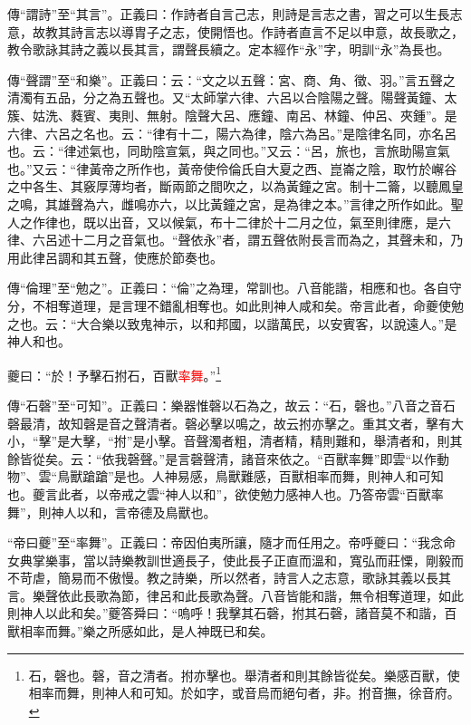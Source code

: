 {\noindent\zhuan{}\fzbyks 傳“謂詩”至“其言”。正義曰：作詩者自言己志，則詩是言志之書，習之可以生長志意，故教其詩言志以導胄子之志，使開悟也。作詩者直言不足以申意，故長歌之，教令歌詠其詩之義以長其言，謂聲長續之。定本經作“永”字，明訓“永”為長也。 \par}

{\noindent\zhuan{}\fzbyks 傳“聲謂”至“和樂”。正義曰：云：“文之以五聲：宮、商、角、徵、羽。”言五聲之清濁有五品，分之為五聲也。又“太師掌六律、六呂以合陰陽之聲。陽聲黃鐘、太簇、姑洗、蕤賓、夷則、無射。陰聲大呂、應鐘、南呂、林鐘、仲呂、夾鍾”。是六律、六呂之名也。云：“律有十二，陽六為律，陰六為呂。”是陰律名同，亦名呂也。云：“律述氣也，同助陰宣氣，與之同也。”又云：“呂，旅也，言旅助陽宣氣也。”又云：“律黃帝之所作也，黃帝使伶倫氏自大夏之西、崑崙之陰，取竹於嶰谷之中各生、其竅厚薄均者，斷兩節之間吹之，以為黃鐘之宮。制十二籥，以聽鳳皇之鳴，其雄聲為六，雌鳴亦六，以比黃鐘之宮，是為律之本。”言律之所作如此。聖人之作律也，既以出音，又以候氣，布十二律於十二月之位，氣至則律應，是六律、六呂述十二月之音氣也。“聲依永”者，謂五聲依附長言而為之，其聲未和，乃用此律呂調和其五聲，使應於節奏也。 \par}

{\noindent\zhuan{}\fzbyks 傳“倫理”至“勉之”。正義曰：“倫”之為理，常訓也。八音能諧，相應和也。各自守分，不相奪道理，是言理不錯亂相奪也。如此則神人咸和矣。帝言此者，命夔使勉之也。云：“大合樂以致鬼神示，以和邦國，以諧萬民，以安賓客，以說遠人。”是神人和也。 \par}

夔曰：“於！予擊石拊石，百獸\textcolor{red}{率舞}。”\footnote{石，磬也。磬，音之清者。拊亦擊也。舉清者和則其餘皆從矣。樂感百獸，使相率而舞，則神人和可知。於如字，或音烏而絕句者，非。拊音撫，徐音府。}

{\noindent\zhuan{}\fzbyks 傳“石磬”至“可知”。正義曰：樂器惟磬以石為之，故云：“石，磬也。”八音之音石磬最清，故知磬是音之聲清者。磬必擊以鳴之，故云拊亦擊之。重其文者，擊有大小，“擊”是大擊，“拊”是小擊。音聲濁者粗，清者精，精則難和，舉清者和，則其餘皆從矣。云：“依我磬聲。”是言磬聲清，諸音來依之。“百獸率舞”即雲“以作動物”、雲“鳥獸蹌蹌”是也。人神易感，鳥獸難感，百獸相率而舞，則神人和可知也。夔言此者，以帝戒之雲“神人以和”，欲使勉力感神人也。乃答帝雲“百獸率舞”，則神人以和，言帝德及鳥獸也。 \par}

{\noindent\shu{}\fzkt “帝曰夔”至“率舞”。正義曰：帝因伯夷所讓，隨才而任用之。帝呼夔曰：“我念命女典掌樂事，當以詩樂教訓世適長子，使此長子正直而溫和，寬弘而莊慄，剛毅而不苛虐，簡易而不傲慢。教之詩樂，所以然者，詩言人之志意，歌詠其義以長其言。樂聲依此長歌為節，律呂和此長歌為聲。八音皆能和諧，無令相奪道理，如此則神人以此和矣。”夔答舜曰：“嗚呼！我擊其石磬，拊其石磬，諸音莫不和諧，百獸相率而舞。”樂之所感如此，是人神既已和矣。 \par}

